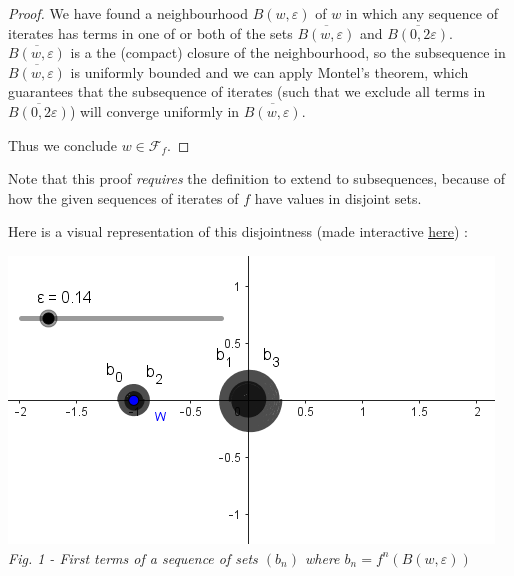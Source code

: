 \documentclass{article}
\begin{document}
\begin{proof}
We have found a neighbourhood $B(w,\varepsilon)$ of $w$ in which any sequence of iterates has terms in one of or both of the sets $\overline{B(w, \varepsilon)}$ and $\overline{B(0, 2 \varepsilon)}$. \\
\vspace{2mm}
$\overline{B(w, \varepsilon)}$ is a the (compact) closure of the neighbourhood, so the subsequence in $\overline{B(w, \varepsilon)}$ is uniformly bounded and we can apply Montel's theorem, which guarantees that the subsequence of iterates (such that we exclude all terms in $\overline{B(0, 2 \varepsilon)}$) will converge uniformly in $\overline{B(w, \varepsilon)}$. \\
\vspace{5mm}

Thus we conclude $w \in \mathcal{F}_f$. 
\end{proof}

Note that this proof \textit{requires} the definition to extend to subsequences, because of how the given sequences of iterates of $f$ have values in disjoint sets. \\
\vspace{2mm}

Here is a visual representation of this disjointness (made interactive \textcolor{blue}{\underline{\href{https://www.geogebra.org/m/vy55mhwu}{here}}}) : \\
\vspace{-3mm}
\begin{center}
\includegraphics[scale=0.9]{complementminus1} \\
\textit{Fig. 1 - First terms of a sequence of sets $(b_n)$ where $b_n = f^n(B(w, \varepsilon))$}
\end{center}
\end{document}
